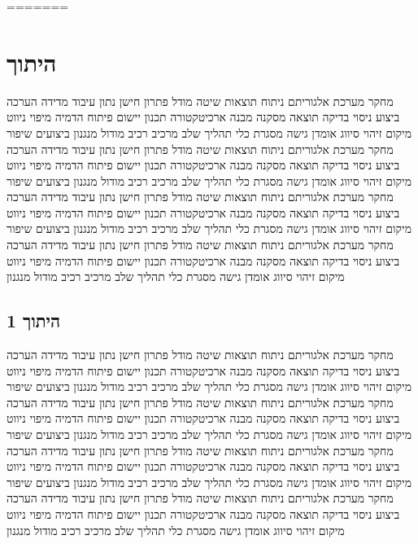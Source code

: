 \cite{MossEcholocation, BenDavid2022Adaptive, Julier1997CovarianceIntersection, Mohamed1999Adaptive, BarShalom2001Estimation}
=======
\section{היתוך}
\label{sec:ch05}

מחקר מערכת אלגוריתם ניתוח תוצאות שיטה מודל פתרון חישן נתון עיבוד מדידה הערכה ביצוע ניסוי בדיקה תוצאה מסקנה מבנה ארכיטקטורה תכנון יישום פיתוח הדמיה מיפוי ניווט מיקום זיהוי סיווג אומדן גישה מסגרת כלי תהליך שלב מרכיב רכיב מודול מנגנון ביצועים שיפור מחקר מערכת אלגוריתם ניתוח תוצאות שיטה מודל פתרון חישן נתון עיבוד מדידה הערכה ביצוע ניסוי בדיקה תוצאה מסקנה מבנה ארכיטקטורה תכנון יישום פיתוח הדמיה מיפוי ניווט מיקום זיהוי סיווג אומדן גישה מסגרת כלי תהליך שלב מרכיב רכיב מודול מנגנון ביצועים שיפור מחקר מערכת אלגוריתם ניתוח תוצאות שיטה מודל פתרון חישן נתון עיבוד מדידה הערכה ביצוע ניסוי בדיקה תוצאה מסקנה מבנה ארכיטקטורה תכנון יישום פיתוח הדמיה מיפוי ניווט מיקום זיהוי סיווג אומדן גישה מסגרת כלי תהליך שלב מרכיב רכיב מודול מנגנון ביצועים שיפור מחקר מערכת אלגוריתם ניתוח תוצאות שיטה מודל פתרון חישן נתון עיבוד מדידה הערכה ביצוע ניסוי בדיקה תוצאה מסקנה מבנה ארכיטקטורה תכנון יישום פיתוח הדמיה מיפוי ניווט מיקום זיהוי סיווג אומדן גישה מסגרת כלי תהליך שלב מרכיב רכיב מודול מנגנון

\subsection{היתוך 1}
\label{sub:ch05_1}
מחקר מערכת אלגוריתם ניתוח תוצאות שיטה מודל פתרון חישן נתון עיבוד מדידה הערכה ביצוע ניסוי בדיקה תוצאה מסקנה מבנה ארכיטקטורה תכנון יישום פיתוח הדמיה מיפוי ניווט מיקום זיהוי סיווג אומדן גישה מסגרת כלי תהליך שלב מרכיב רכיב מודול מנגנון ביצועים שיפור מחקר מערכת אלגוריתם ניתוח תוצאות שיטה מודל פתרון חישן נתון עיבוד מדידה הערכה ביצוע ניסוי בדיקה תוצאה מסקנה מבנה ארכיטקטורה תכנון יישום פיתוח הדמיה מיפוי ניווט מיקום זיהוי סיווג אומדן גישה מסגרת כלי תהליך שלב מרכיב רכיב מודול מנגנון ביצועים שיפור מחקר מערכת אלגוריתם ניתוח תוצאות שיטה מודל פתרון חישן נתון עיבוד מדידה הערכה ביצוע ניסוי בדיקה תוצאה מסקנה מבנה ארכיטקטורה תכנון יישום פיתוח הדמיה מיפוי ניווט מיקום זיהוי סיווג אומדן גישה מסגרת כלי תהליך שלב מרכיב רכיב מודול מנגנון ביצועים שיפור מחקר מערכת אלגוריתם ניתוח תוצאות שיטה מודל פתרון חישן נתון עיבוד מדידה הערכה ביצוע ניסוי בדיקה תוצאה מסקנה מבנה ארכיטקטורה תכנון יישום פיתוח הדמיה מיפוי ניווט מיקום זיהוי סיווג אומדן גישה מסגרת כלי תהליך שלב מרכיב רכיב מודול מנגנון

